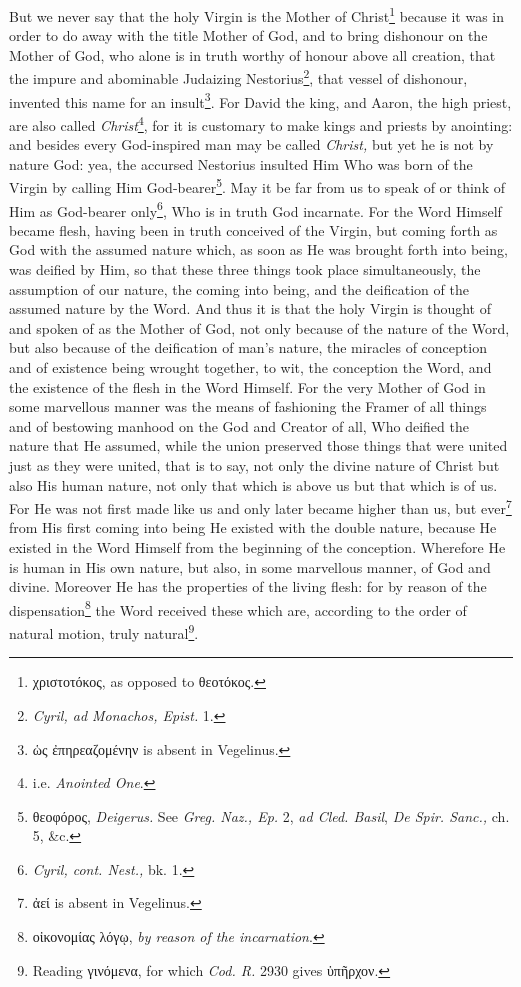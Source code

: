 But we never say that the holy Virgin is the Mother of Christ\footnote{\textgreek{χριστοτόκος}, as opposed to \textgreek{θεοτόκος}.} because it was in order to do away with the title Mother of God, and to bring dishonour on the Mother of God, who alone is in truth worthy of honour above all creation, that the impure and abominable Judaizing Nestorius\footnote{\emph{Cyril, ad Monachos, Epist. }1.}, that vessel of dishonour, invented this name for an insult\footnote{\textgreek{ὡς ἐπηρεαζομένην} is absent in Vegelinus.}. For David the king, and Aaron, the high priest, are also called \emph{Christ}\footnote{i.e. \emph{Anointed One}.}, for it is customary to make kings and priests by anointing: and besides every God-inspired man may be called \emph{Christ, }but yet he is not by nature God: yea, the accursed Nestorius insulted Him Who was born of the Virgin by calling Him God-bearer\footnote{\textgreek{θεοφόρος}, \emph{Deigerus. }See \emph{Greg. Naz., Ep. }2, \emph{ad Cled. Basil}, \emph{De Spir. Sanc., }ch. 5, \&c.}. May it be far from us to speak of or think of Him as God-bearer only\footnote{\emph{Cyril, cont. Nest., }bk. 1.}, Who is in truth God incarnate. For the Word Himself became flesh, having been in truth conceived of the Virgin, but coming forth as God with the assumed nature which, as soon as He was brought forth into being, was deified by Him, so that these three things took place simultaneously, the assumption of our nature, the coming into being, and the deification of the assumed nature by the Word. And thus it is that the holy Virgin is thought of and spoken of as the Mother of God, not only because of the nature of the Word, but also because of the deification of man’s nature, the miracles of conception and of existence being wrought together, to wit, the conception the Word, and the existence of the flesh in the Word Himself. For the very Mother of God in some marvellous manner was the means of fashioning the Framer of all things and of bestowing manhood on the God and Creator of all, Who deified the nature that He assumed, while the union preserved those things that were united just as they were united, that is to say, not only the divine nature of Christ but also His human nature, not only that which is above us but that which is of us. For He was not first made like us and only later became higher than us, but ever\footnote{\textgreek{ἀεί} is absent in Vegelinus.} from His first coming into being He existed with the double nature, because He existed in the Word Himself from the beginning of the conception. Wherefore He is human in His own nature, but also, in some marvellous manner, of God and divine. Moreover He has the properties of the living flesh: for by reason of the dispensation\footnote{\textgreek{οἰκονομίας λόγῳ}, \emph{by reason of the incarnation}.} the Word received these which are, according to the order of natural motion, truly natural\footnote{Reading \textgreek{γινόμενα}, for which \emph{Cod. R. }2930 gives \textgreek{ὑπῆρχον}.}.

